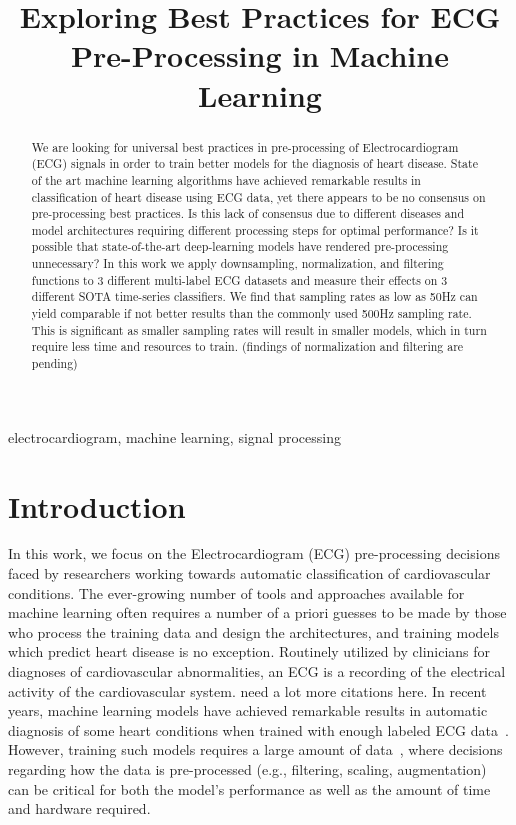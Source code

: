 \documentclass[pmlr,twocolumn]{jmlr}%
\title[ECG Scaling]{Exploring Best Practices for ECG Pre-Processing in Machine Learning}
\author{\Name{Amir Salimi} \Email{{asalimi@ualberta.ca}\\
\Name{Abram Hindle} \Email{abram.hindle@ualberta.ca}\\
\Name{Osmar Zaiane} \Email{zaiane@ualberta.ca}\\
\Name{others} \Email{CVC@ualberta.ca}\\
\addr University of Alberta}}
\begin{document}
\maketitle

\begin{abstract}
We are looking for universal best practices in pre-processing of Electrocardiogram (ECG) signals in order to train better models for the diagnosis of heart disease.
State of the art machine learning algorithms have achieved remarkable results in classification of heart disease using ECG data, yet there appears to be no consensus on pre-processing best practices.  Is this lack of consensus due to different diseases and model architectures requiring different processing steps for optimal performance? Is it possible that state-of-the-art deep-learning models have rendered pre-processing unnecessary? In this work we apply downsampling, normalization, and filtering functions to 3 different multi-label ECG datasets and measure their effects on 3 different SOTA time-series classifiers. We find that sampling rates as low as 50Hz can yield comparable if not better results than the commonly used 500Hz sampling rate. This is significant as smaller sampling rates will result in smaller models, which in turn require less time and resources to train. (findings of normalization and filtering are pending)

\end{abstract}
\begin{keywords}
electrocardiogram, machine learning, signal processing
\end{keywords}


\section{Introduction}
\label{sec:intro}
In this work, we focus on the Electrocardiogram (ECG) pre-processing decisions faced by researchers working towards automatic classification of cardiovascular conditions. The ever-growing number of tools and approaches available for machine learning often requires a number of a priori guesses to be made by those who process the training data and design the architectures, and training models which predict heart disease is no exception.
Routinely utilized by clinicians for diagnoses of cardiovascular abnormalities, an ECG is a recording of the electrical activity of the cardiovascular system. {\color{red} need a lot more citations here}. In recent years, machine learning models have achieved remarkable results in automatic diagnosis of some heart conditions when trained with enough labeled ECG data~\cite{reyna2021will,reyna4issues}. However, training such models requires a large amount of data~\cite{reyna2021will,reyna4issues,natarajan2020wide,ribeiro2020automatic}, where decisions regarding how the data is pre-processed (e.g., filtering, scaling, augmentation) can be critical for both the model's performance as well as the amount of time and hardware required. 
\end{document}
